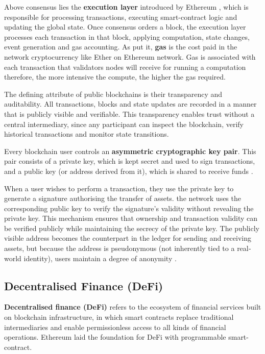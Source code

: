 \documentclass[12pt,a4paper]{article}
\begin{document}
Above consensus lies the \textbf{execution layer} introduced by Ethereum \parencite{ethereum}, which is responsible for processing transactions, executing smart-contract logic and updating the global state. Once consensus orders a block, the execution layer processes each transaction in that block, applying computation, state changes, event generation and gas accounting. As \textcite{masla2021reduction} put it, \textbf{gas} is the cost paid in the network cryptocurrency like Ether on Ethereum network. Gas is associated with each transaction that validators nodes will receive for running a computation therefore, the more intensive the compute, the higher the gas required. 

The defining attribute of public blockchains is their transparency and auditability. All transactions, blocks and state updates are recorded in a manner that is publicly visible and verifiable. This transparency enables trust without a central intermediary, since any participant can inspect the blockchain, verify historical transactions and monitor state transitions. 

Every blockchain user controls an \textbf{asymmetric cryptographic key pair}. This pair consists of a private key, which is kept secret and used to sign transactions, and a public key (or address derived from it), which is shared to receive funds \parencite{aydar2019private}. 

When a user wishes to perform a transaction, they use the private key to generate a signature authorising the transfer of assets. the network uses the corresponding public key to verify the signature’s validity without revealing the private key. This mechanism ensures that ownership and transaction validity can be verified publicly while maintaining the secrecy of the private key. The publicly visible address becomes the counterpart in the ledger for sending and receiving assets, but because the address is pseudonymous (not inherently tied to a real‐world identity), users maintain a degree of anonymity \parencite{JAMWAL2024104019}.

\subsection{Decentralised Finance (DeFi)}
\textbf{Decentralised finance (DeFi)} refers to the ecosystem of financial services built on blockchain infrastructure, in which smart contracts replace traditional intermediaries and enable permissionless access to all kinds of financial operations. Ethereum \parencite{ethereum} laid the foundation for DeFi with programmable smart-contract. 
\end{document}
